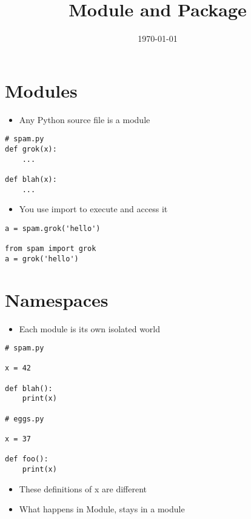 \documentclass[11pt]{article}
\date{\today}
\title{Module and Package}
\begin{document}
\maketitle
\tableofcontents

\section*{Modules}
\label{sec:orgheadline1}
\begin{itemize}
\item Any Python source file is a module
\end{itemize}
\begin{verbatim}
# spam.py
def grok(x):
    ...

def blah(x):
    ...
\end{verbatim}

\begin{itemize}
\item You use import to execute and access it
\end{itemize}
\begin{verbatim}
a = spam.grok('hello')

from spam import grok
a = grok('hello')
\end{verbatim}

\section*{Namespaces}
\label{sec:orgheadline2}
\begin{itemize}
\item Each module is its own isolated world
\end{itemize}
\begin{verbatim}
# spam.py

x = 42

def blah():
    print(x)

# eggs.py

x = 37 

def foo():
    print(x)
\end{verbatim}
\begin{itemize}
\item These definitions of x are different
\item What happens in Module, stays in a module
\end{itemize}
\end{document}
